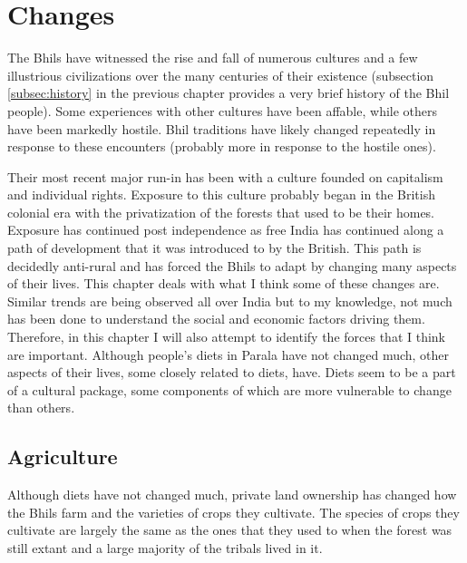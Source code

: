 \documentclass[report.tex]{subfiles}
\begin{document}
\chapter{Changes}\label{chp:changes}

The Bhils have witnessed the rise and fall of numerous cultures and a few illustrious civilizations over the many centuries of their existence (subsection \ref{subsec:history} in the previous chapter provides a very brief history of the Bhil people). Some experiences with other cultures have been affable, while others have been markedly hostile. Bhil traditions have likely changed repeatedly in response to these encounters (probably more in response to the hostile ones).

Their most recent major run-in has been with a culture founded on capitalism and individual rights. Exposure to this culture probably began in the British colonial era with the privatization of the forests that used to be their homes. Exposure has continued post independence as free India has continued along a path of development that it was introduced to by the British. This path is decidedly anti-rural and has forced the Bhils to adapt by changing many aspects of their lives. This chapter deals with what I think some of these changes are. Similar trends are being observed all over India but to my knowledge, not much has been done to understand the social and economic factors driving them. Therefore, in this chapter I will also attempt to identify the forces that I think are important. Although people's diets in Parala have not changed much, other aspects of their lives, some closely related to diets, have. Diets seem to be a part of a cultural package, some components of which are more vulnerable to change than others.

\section{Agriculture}\label{sec:agriculture}

Although diets have not changed much, private land ownership has changed how the Bhils farm and the varieties of crops they cultivate. The species of crops they cultivate are largely the same as the ones that they used to when the forest was still extant and a large majority of the tribals lived in it.
\end{document}

